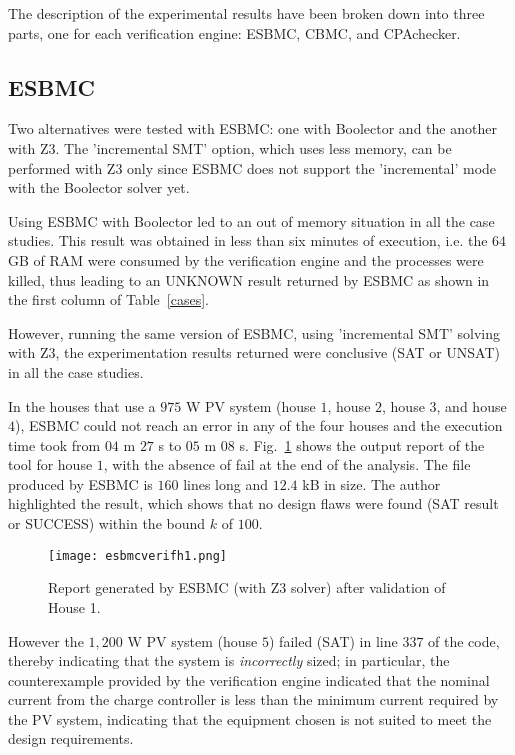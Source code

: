 The description of the experimental results have been broken down into three parts, one for each verification engine: ESBMC, CBMC, and CPAchecker. 

\subsection{ESBMC}
\label{sec:ESBMCverification}

Two alternatives were tested with ESBMC: one with Boolector and the another with Z3. The 'incremental SMT' option, which uses less memory, can be performed with Z3 only since ESBMC does not support the 'incremental' mode with the Boolector solver yet. 

Using ESBMC with Boolector led to an out of memory situation in all the case studies. This result was obtained in less than six minutes of execution, i.e. the $64$ GB of RAM were consumed by the verification engine and the processes were killed, thus leading to an UNKNOWN result returned by ESBMC as shown in the first column of Table~\ref{cases}. 

However, running the same version of ESBMC, using 'incremental SMT' solving with Z3, the experimentation results returned were conclusive (SAT or UNSAT) in all the case studies. 

In the houses that use a $975$ W PV system (house $1$, house $2$, house $3$, and house $4$), ESBMC could not reach an error in any of the four houses and the execution time took from $04$ m $27$ s to $05$ m $08$ s. Fig.~\ref{fig:esbmcverifhouse1} shows the output report of the tool for house $1$, with the absence of fail at the end of the analysis. The file produced by ESBMC is $160$ lines long and $12.4$ kB in size. The author highlighted the result, which shows that no design flaws were found (SAT result or SUCCESS) within the bound $k$ of $100$.

\begin{figure}[h]
\texttt{[image: esbmcverifh1.png]}
\centering
\caption{Report generated by ESBMC (with Z3 solver) after validation of House 1.}
\label{fig:esbmcverifhouse1}
\end{figure}

However the $1,200$ W PV system (house $5$) failed (SAT) in line $337$ of the code, thereby indicating that the system is \textit{incorrectly} sized; in particular, the counterexample provided by the verification engine indicated that the nominal current from the charge controller is less than the minimum current required by the PV system, indicating that the equipment chosen is not suited to meet the design requirements.


